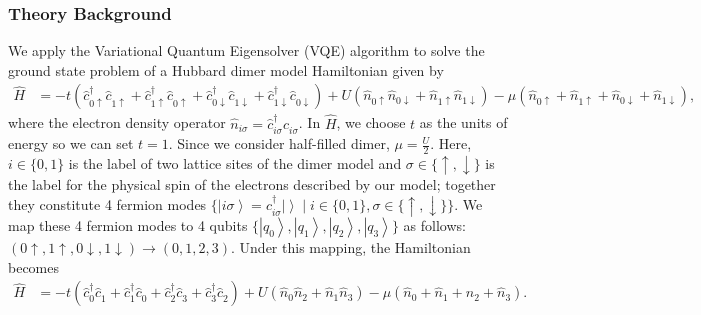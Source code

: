 
\newcommand{\ra}{\rangle}
\newcommand{\la}{\langle}
\newcommand{\ua}{ {\uparrow} }
\newcommand{\da}{ {\downarrow} }
\newcommand{\mb}{\mathbf}
\renewcommand{\Im}{\operatorname{Im}}
\renewcommand{\Re}{\operatorname{Re}}
\newcommand{\sgn}{\operatorname{sgn}}
\newcommand{\Tr}{\operatorname{Tr}}
\newcommand{\bra}[1]{\left\langle{#1}\right\vert}
\newcommand{\ket}[1]{\left\vert{#1}\right\rangle}
\newcommand{\ip}[2]{\left\langle{#1}\middle\vert{#2}\right\rangle}
\newcommand{\melem}[3]{\left\langle{#1}\middle\vert{#2}\middle\vert{#3}\right\rangle}
\newcommand{\expval}[1]{\left\langle{#1}\right\rangle}
\newcommand{\op}[2]{\left\vert{#1}\middle\rangle\middle\langle{#2}\right\vert}
\renewcommand{\textuparrow}{$\uparrow$}
\renewcommand{\textdownarrow}{$\downarrow$}

\subsubsection*{Theory Background}
We apply the Variational Quantum Eigensolver (VQE) algorithm to solve the ground state problem of a Hubbard dimer model Hamiltonian given by
\begin{align*}
\hat{H} &= -t\left(
    \hat{c}_{0\ua}^\dagger \hat{c}_{1\ua}^{\phantom{\dagger}} +
    \hat{c}_{1\ua}^\dagger \hat{c}_{0\ua}^{\phantom{\dagger}} +
    \hat{c}_{0\da}^\dagger \hat{c}_{1\da}^{\phantom{\dagger}} + 
    \hat{c}_{1\da}^\dagger \hat{c}_{0\da}^{\phantom{\dagger}}\right) +
    U\left(\hat{n}_{0\ua} \hat{n}_{0\da} + \hat{n}_{1\ua} \hat{n}_{1\da}\right) -
    \mu\left(\hat{n}_{0\ua}+\hat{n}_{1\ua}+\hat{n}_{0\da}+\hat{n}_{1\da}\right),  
\end{align*}
where the electron density operator $\hat{n}_{i\sigma} = \hat{c}_{i\sigma}^\dagger \hat{c}_{i\sigma}^{\phantom{\dagger}}$. In $\hat{H}$, we choose $t$ as the units of energy so we can set $t = 1$. Since we consider half-filled dimer, $\mu = \frac{U}{2}$. Here, $i\in\{0,1\}$ is the label of two lattice sites of the dimer model and $\sigma\in \{\ua,\da\}$ is the label for the physical spin of the electrons described by our model; together they constitute 4 fermion modes $\{\ket{i\sigma} = c_{i\sigma}^\dagger\ket{} \mid i \in \{0,1\},\sigma\in \{\ua,\da\} \}$. We map these 4 fermion modes to 4 qubits $\{\ket{q_0}, \ket{q_1}, \ket{q_2}, \ket{q_3}\}$ as follows: $(0\ua, 1\ua, 0\da,1\da) \to (0, 1, 2, 3)$. Under this mapping, the Hamiltonian becomes
\begin{align*}
\hat{H} &= -t\left(
    \hat{c}_{0}^\dagger \hat{c}_{1}^{\phantom{\dagger}} +
    \hat{c}_{1}^\dagger \hat{c}_{0}^{\phantom{\dagger}} +
    \hat{c}_{2}^\dagger \hat{c}_{3}^{\phantom{\dagger}} + 
    \hat{c}_{3}^\dagger \hat{c}_{2}^{\phantom{\dagger}}\right) +
    U\left(\hat{n}_{0} \hat{n}_{2} + \hat{n}_{1} \hat{n}_{3}\right) -
    \mu\left(\hat{n}_{0}+\hat{n}_{1}+\hat{n}_{2}+\hat{n}_{3}\right).  
\end{align*}

